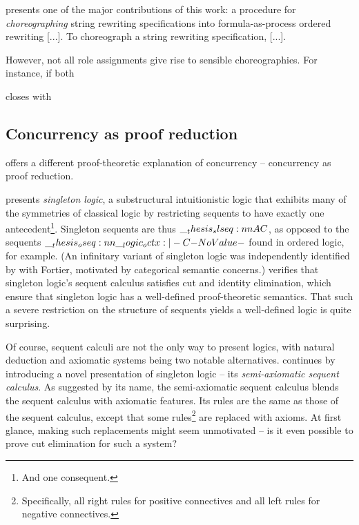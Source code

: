 

 presents one  of the major contributions of this work: a procedure for \emph{choreographing} string rewriting specifications into formula-as-process ordered rewriting [...].
To choreograph a string rewriting specification, [...].

However, not all role assignments give rise to sensible choreographies.
For instance, if both



 closes with


\subsection{Concurrency as proof reduction}

 offers a different proof-theoretic explanation of concurrency -- concurrency as proof reduction.

 presents \emph{singleton logic}, a substructural intuitionistic logic that exhibits many of the symmetries of classical logic by restricting sequents to have exactly one antecedent\footnote{And one consequent.}.
Singleton sequents are thus $\slseq{A |- C}$, as opposed to the sequents $\oseq{\octx |- C}$ found in ordered logic, for example.
(An infinitary variant of singleton logic was independently identified by \citeauthor{Santocanale:FOSSACS02} with Fortier\autocites{Santocanale:FOSSACS02}{Fortier+Santocanale:CSL13}, motivated by categorical semantic concerns.)
 verifies that singleton logic's sequent calculus satisfies cut and identity elimination, which ensure that singleton logic has a well-defined proof-theoretic semantics.%
That such a severe restriction on the structure of sequents yields a well-defined logic is quite surprising.

Of course, sequent calculi are not the only way to present logics, with natural deduction and axiomatic systems being two notable alternatives.
 continues by introducing a novel presentation of singleton logic -- its \emph{semi-axiomatic sequent calculus}.
As suggested by its name, the semi-axiomatic sequent calculus blends the sequent calculus with axiomatic features.
Its rules are the same as those of the sequent calculus, except that some rules\footnote{Specifically, all right rules for positive connectives and all left rules for negative connectives.} are replaced with axioms.
At first glance, making such replacements might seem unmotivated --
is it even possible to prove cut elimination for such a system?

